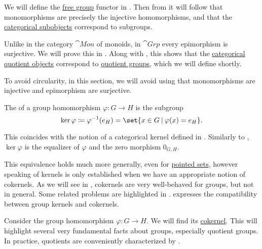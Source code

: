 \begin{definition}
\begin{thmenum}
    We will define the \hyperref[def:free_group]{free group} functor in . Then from  it will follow that monomorphisms are precisely the injective homomorphisms, and that the \hyperref[def:subobject_and_quotient]{categorical subobjects} correspond to subgroups.

    Unlike in the category \hyperref[def:monoid/category]{\( \cat{Mon} \)} of monoids, in \( \cat{Grp} \) every epimorphism is surjective. We will prove this in . Along with , this shows that the \hyperref[def:subobject_and_quotient]{categorical quotient objects} correspond to \hyperref[def:group/quotient]{quotient groups}, which we will define shortly.

    To avoid circularity, in this section, we will avoid using that monomorphisms are injective and epimorphism are surjective.

     The  of a group homomorphism \( \varphi: G \to H \) is the subgroup
    \begin{equation*}
      \ker \varphi \coloneqq \varphi^{-1}(e_H) = \set{ x \in G \given \varphi(x) = e_H }.
    \end{equation*}

    This coincides with the notion of a categorical kernel defined in . Similarly to , \( \ker \varphi \) is the equalizer of \( \varphi \) and the zero morphism \( 0_{G,H} \).

    This equivalence holds much more generally, even for \hyperref[rem:pointed_set]{pointed sets}, however speaking of kernels is only established when we have an appropriate notion of cokernels. As we will see in , cokernels are very well-behaved for groups, but not in general. Some related problems are highlighted in \cite[ch. 8]{Golan2010}.  expresses the compatibility between group kernels and cokernels.

     Consider the group homomorphism \( \varphi: G \to H \). We will find its \hyperref[def:zero_morphisms/cokernel]{cokernel}. This will highlight several very fundamental facts about groups, especially quotient groups. In practice, quotients are conveniently characterized by .


\end{thmenum}
\end{definition}
